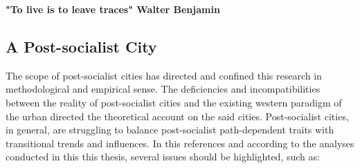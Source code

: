 \documentclass[11pt]{report}
\begin{document}
\textbf{"To live is to leave traces" Walter Benjamin}

\subsection{A Post-socialist City}

The scope of post-socialist cities has directed and confined this research in methodological and empirical sense.
The deficiencies and incompatibilities between the reality of post-socialist cities and the existing western paradigm of the urban directed the theoretical account on the said cities.
Post-socialist cities, in general, are struggling to balance post-socialist path-dependent traits with transitional trends and influences.
In this references and according to the analyses conducted in this this thesis, several issues should be highlighted, such as:
\end{document}
